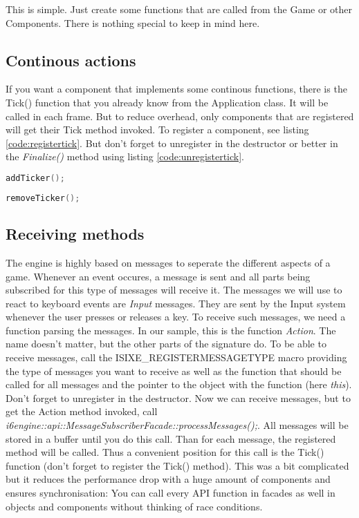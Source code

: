 \documentclass{article}
\begin{document}
This is simple. Just create some functions that are called from the Game or other Components. There is nothing special to keep in mind here.

\subsection{Continous actions}

If you want a component that implements some continous functions, there is the Tick() function that you already know from the Application class. It will be called in each frame. But to reduce overhead, only components that are registered will get their Tick method invoked. To register a component, see listing \ref{code:registertick}. But don't forget to unregister in the destructor or better in the \textit{Finalize()} method using listing \ref{code:unregistertick}.
\begin{lstlisting}[language=C++, style=basic, caption={}, label=code:registertick]
addTicker();
\end{lstlisting}
\begin{lstlisting}[language=C++, style=basic, caption={}, label=code:unregistertick]
removeTicker();
\end{lstlisting}

\subsection{Receiving methods}

The engine is highly based on messages to seperate the different aspects of a game. Whenever an event occures, a message is sent and all parts being subscribed for this type of messages will receive it. The messages we will use to react to keyboard events are \textit{Input} messages. They are sent by the Input system whenever the user presses or releases a key. To receive such messages, we need a function parsing the messages. In our sample, this is the function \textit{Action}. The name doesn't matter, but the other parts of the signature do. To be able to receive messages, call the ISIXE_REGISTERMESSAGETYPE macro providing the type of messages you want to receive as well as the function that should be called for all messages and the pointer to the object with the function (here \textit{this}). Don't forget to unregister in the destructor. Now we can receive messages, but to get the Action method invoked, call \textit{i6engine::api::MessageSubscriberFacade::processMessages();}. All messages will be stored in a buffer until you do this call. Than for each message, the registered method will be called. Thus a convenient position for this call is the Tick() function (don't forget to register the Tick() method). This was a bit complicated but it reduces the performance drop with a huge amount of components and ensures synchronisation: You can call every API function in facades as well in objects and components without thinking of race conditions.
\end{document}
